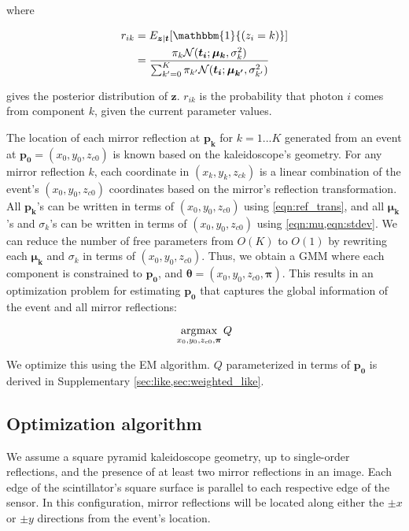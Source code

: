 where 
\begin{linenomath}
\begin{equation} \label{eqn:r_ik}
\begin{aligned}
r_{ik} & = E_{\bm{z}|\bm{t}}[\mathbbm{1}{(z_i=k)}] \\ & = \frac{\pi_k \mathcal{N}(\bm{t_i};\bm{\mu_k},{\sigma_k^2})}{\sum_{k'=0}^K \pi_{k'} \mathcal{N}(\bm{t_i};\bm{\mu_{k'}},{\sigma_{k'}^2})}
\end{aligned}
\end{equation}
\end{linenomath}
gives the posterior distribution of $\bm{z}$.
$r_{ik}$ is the probability that photon $i$ comes from component $k$, given 
the current parameter values.

The location of each mirror reflection at $\bm{p_k}$ for $k=1...K$ generated from 
an event at $\bm{p_0}=(x_0,y_0,z_{c0})$ is known based on the kaleidoscope's geometry.
For any mirror reflection $k$, each coordinate in $(x_k,y_k,z_{ck})$ is a linear 
combination of the event's $(x_0,y_0,z_{c0})$ coordinates based on the mirror's 
reflection transformation.
All $\bm{p_k}$'s can be written in terms of $(x_0,y_0,z_{c0})$ using 
\cref{eqn:ref_trans}, and all $\bm{\mu_k}$'s and $\sigma_k$'s can be written in 
terms of $(x_0,y_0,z_{c0})$ using \cref{eqn:mu,eqn:stdev}.
We can reduce the number of free parameters from $O(K)$ 
to $O(1)$ by rewriting each $\bm{\mu_k}$ and $\sigma_k$ in terms of 
$(x_0,y_0,z_{c0})$.
Thus, we obtain a GMM where each component is constrained to $\bm{p_0}$, and 
$\bm{\theta}=(x_0,y_0,z_{c0},\bm{\pi})$.
This results in an optimization problem for estimating $\bm{p_0}$ that captures 
the global information of the event and all mirror reflections:
\begin{linenomath}
\begin{equation} \label{eqn:opti_prob}
\operatorname*{\arg\!\max}_{x_0,y_0,z_{c0},\bm{\pi}} Q
\end{equation}
\end{linenomath}
We optimize this using the EM algorithm.
$Q$ parameterized in terms of $\bm{p_0}$ is derived in Supplementary \cref*{sec:like,sec:weighted_like}.

\subsection{Optimization algorithm}
We assume a square pyramid kaleidoscope geometry, up to single-order reflections, 
and the presence of at least two mirror reflections in an image.
Each edge of the scintillator's square surface is parallel to each respective edge 
of the sensor.
In this configuration, mirror reflections will be located along either the 
$\pm x$ or $\pm y$ directions from the event's location.

